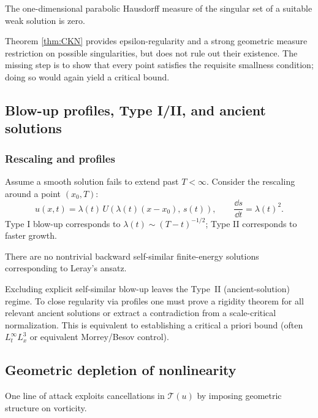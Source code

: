 \begin{theorem}\label{thm:CKN}
The one-dimensional parabolic Hausdorff measure of the singular set of a suitable weak solution is zero.
\end{theorem}

\begin{proposition}\label{prop:ckn-wall}
Theorem \ref{thm:CKN} provides epsilon-regularity and a strong geometric measure restriction on
possible singularities, but does not rule out their existence. The missing step is to show that every point
satisfies the requisite smallness condition; doing so would again yield a critical bound.
\end{proposition}

\subsection{Blow-up profiles, Type I/II, and ancient solutions}
\subsubsection{Rescaling and profiles}
Assume a smooth solution fails to extend past $T<\infty$.
Consider the rescaling around a point $(x_0,T)$:
\[
u(x,t)=\lambda(t)\,U\!\left(\lambda(t)(x-x_0),\, s(t)\right),\qquad \frac{\dd s}{\dd t}=\lambda(t)^2.
\]
Type I blow-up corresponds to $\lambda(t)\sim (T-t)^{-1/2}$; Type II corresponds to faster growth.

\begin{theorem}
There are no nontrivial backward self-similar finite-energy solutions corresponding to Leray's ansatz.
\end{theorem}

\begin{proposition}\label{prop:profile-wall}
Excluding explicit self-similar blow-up leaves the Type~II (ancient-solution) regime.
To close regularity via profiles one must prove a rigidity theorem for all relevant ancient solutions
or extract a contradiction from a scale-critical normalization. This is equivalent to establishing
a critical a priori bound (often $L^\infty_t L^3_x$ or equivalent Morrey/Besov control).
\end{proposition}

\subsection{Geometric depletion of nonlinearity}\label{sec:geometry}
One line of attack exploits cancellations in $\mathcal T(u)$ by imposing geometric structure on vorticity.

